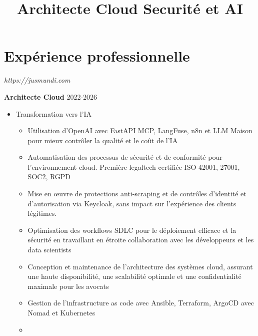 \documentclass[11pt,a4paper]{moderncv}
\title{Architecte Cloud Securité et AI}
\begin{document}
\makecvtitle

\section{Expérience professionnelle}

{
\textit{https://jusmundi.com}
\bigskip

\textbf{Architecte Cloud} \hfill 2022-2026
	\begin{itemize}%
		\item Transformation vers l'IA
			\begin{itemize}%
				\item Utilisation d'OpenAI avec FastAPI MCP, LangFuse, n8n et LLM Maison pour mieux contrôler la qualité et le coût de l'IA
				\item Automatisation des processus de sécurité et de conformité pour l'environnement cloud. Première legaltech certifiée ISO 42001, 27001, SOC2, RGPD
				\item Mise en œuvre de protections anti-scraping et de contrôles d'identité et d'autorisation via Keycloak, sans impact sur l'expérience des clients légitimes.
				\item Optimisation des workflows SDLC pour le déploiement efficace et la sécurité en travaillant en étroite collaboration avec les développeurs et les data scientists
				\item Conception et maintenance de l'architecture des systèmes cloud, assurant une haute disponibilité, une scalabilité optimale et une confidentialité maximale pour les avocats
				\item Gestion de l'infrastructure as code avec Ansible, Terraform, ArgoCD avec Nomad et Kubernetes\item
			\end{itemize}
	\end{itemize}
}
\bigskip
{}
\end{document}
